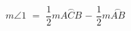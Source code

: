 \documentclass[preview]{standalone}
\begin{document}
\begin{center}
$m\angle{1}$ $=$ $\dfrac{1}{2}$$m\overset{\frown}{ACB}$ $-$ $\dfrac{1}{2}$$m\overset{\frown}{AB}$
\end{center}
\end{document}

